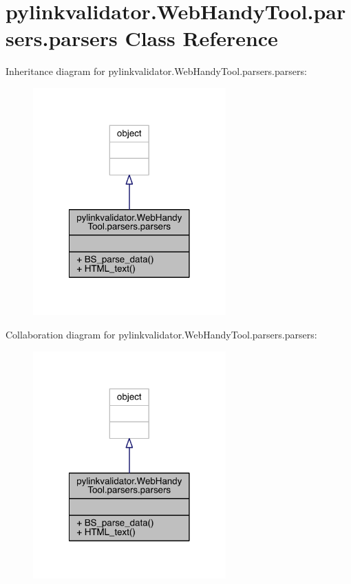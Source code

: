 \hypertarget{classpylinkvalidator_1_1_web_handy_tool_1_1parsers_1_1parsers}{}\section{pylinkvalidator.\+Web\+Handy\+Tool.\+parsers.\+parsers Class Reference}
\label{classpylinkvalidator_1_1_web_handy_tool_1_1parsers_1_1parsers}


Inheritance diagram for pylinkvalidator.\+Web\+Handy\+Tool.\+parsers.\+parsers\+:
\nopagebreak
\begin{figure}[H]
\begin{center}
\leavevmode
\includegraphics[width=210pt]{classpylinkvalidator_1_1_web_handy_tool_1_1parsers_1_1parsers__inherit__graph}
\end{center}
\end{figure}


Collaboration diagram for pylinkvalidator.\+Web\+Handy\+Tool.\+parsers.\+parsers\+:
\nopagebreak
\begin{figure}[H]
\begin{center}
\leavevmode
\includegraphics[width=210pt]{classpylinkvalidator_1_1_web_handy_tool_1_1parsers_1_1parsers__coll__graph}
\end{center}
\end{figure}
